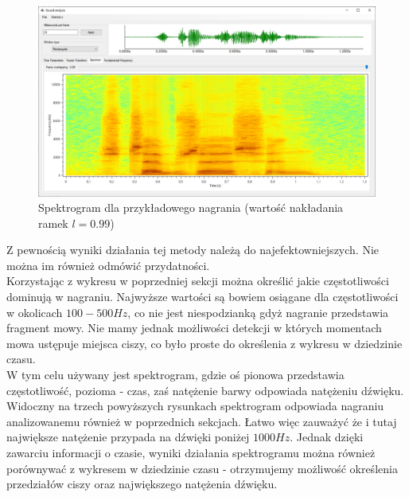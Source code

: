 \documentclass[a4paper]{article}
\begin{document}
\begin{figure}[H]
  \includegraphics[width=\linewidth]{images/06spectrogramHighOverlap.png}
  \caption{Spektrogram dla przykładowego nagrania (wartość nakładania ramek $l=0.99$)}
\end{figure}

Z pewnością wyniki działania tej metody należą do najefektowniejszych. Nie można im również odmówić przydatności.\\
Korzystając z wykresu w poprzedniej sekcji można określić jakie częstotliwości dominują w nagraniu. Najwyższe wartości są bowiem osiągane dla częstotliwości w okolicach $100 - 500Hz$, co nie jest niespodzianką gdyż nagranie przedstawia fragment mowy. Nie mamy jednak możliwości detekcji w których momentach mowa ustępuje miejsca ciszy, co było proste do określenia z wykresu w dziedzinie czasu.\\
W tym celu używany jest spektrogram, gdzie oś pionowa przedstawia częstotliwość, pozioma - czas, zaś natężenie barwy odpowiada natężeniu dźwięku.
Widoczny na trzech powyższych rysunkach spektrogram odpowiada nagraniu analizowanemu również w poprzednich sekcjach. Łatwo więc zauważyć że i tutaj największe natężenie przypada na dźwięki poniżej $1000 Hz$. Jednak dzięki zawarciu informacji o czasie, wyniki działania spektrogramu można również porównywać z wykresem w dziedzinie czasu - otrzymujemy możliwość określenia przedziałów ciszy oraz największego natężenia dźwięku.\\
\end{document}

